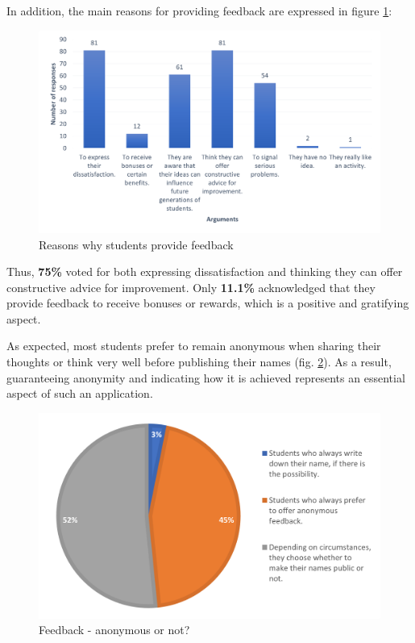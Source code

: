     In addition, the main reasons for providing feedback are expressed in figure \ref{3:fig:reasons_feedback}:
    
    \begin{figure}[ht]
        \centering
             \includegraphics[height=0.322\textheight]{figures/charts/survey/reasons_feedback.png}
        \caption{Reasons why students provide feedback}
        \label{3:fig:reasons_feedback}
    \end{figure}

    Thus, \textbf{75\%} voted for both expressing dissatisfaction and thinking they can offer constructive advice for improvement. Only \textbf{11.1\%} acknowledged that they provide feedback to receive bonuses or rewards, which is a positive and gratifying aspect.
    
    As expected, most students prefer to remain anonymous when sharing their thoughts or think very well before publishing their names (fig. \ref{3:fig:feedback_anonymity}). As a result, guaranteeing anonymity and indicating how it is achieved represents an essential aspect of such an application.
    
    \begin{figure}[ht]
        \centering
             \includegraphics[height=0.25\textheight]{figures/charts/survey/feedback_anonymity.png}
        \caption{Feedback - anonymous or not?}
        \label{3:fig:feedback_anonymity}
    \end{figure}
    
